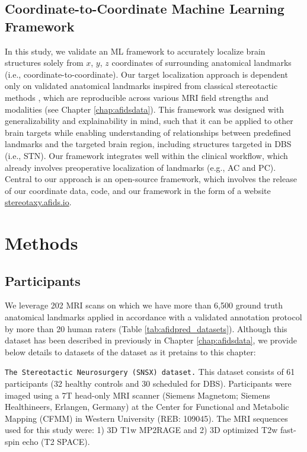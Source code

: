 \subsection{Coordinate-to-Coordinate Machine Learning Framework}
In this study, we validate an ML framework to accurately localize brain structures solely from $x$, $y$, $z$ coordinates of surrounding anatomical landmarks (i.e., coordinate-to-coordinate). Our target localization approach is dependent only on validated anatomical landmarks inspired from classical stereotactic methods \cite{Lau2019-eh, Abbass2022-lf}, which are reproducible across various MRI field strengths and modalities (see Chapter \ref{chap:afidsdata}). This framework was designed with generalizability and explainability in mind, such that it can be applied to other brain targets while enabling understanding of relationships between predefined landmarks and the targeted brain region, including structures targeted in DBS (i.e., STN). Our framework integrates well within the clinical workflow, which already involves preoperative localization of landmarks (e.g., AC and PC). Central to our approach is an open-source framework, which involves the release of our coordinate data, code, and our framework in the form of a website \url{stereotaxy.afids.io}.


\section{Methods}

\subsection{Participants}
We leverage 202 MRI scans on which we have more than 6,500 ground truth anatomical landmarks applied in accordance with a validated annotation protocol \cite{Lau2019-eh} by more than 20 human raters (Table \ref{tab:afidpred_datasets}). Although this dataset has been described in previously in Chapter \ref{chap:afidsdata}, we provide below details to datasets of the dataset as it pretains to this chapter: 

\texttt{The Stereotactic Neurosurgery (SNSX) dataset.} This dataset consists of 61 participants (32 healthy controls and 30 scheduled for DBS). Participants were imaged using a 7T head-only MRI scanner (Siemens Magnetom; Siemens Healthineers, Erlangen, Germany) at the Center for Functional and Metabolic Mapping (CFMM) in Western University (REB: 109045). The MRI sequences used for this study were: 1) 3D T1w MP2RAGE  and 2) 3D optimized T2w fast-spin echo (T2 SPACE).

